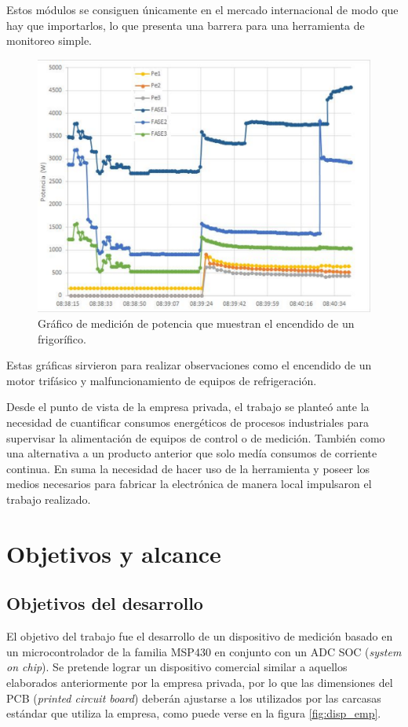 Estos módulos se consiguen únicamente en el mercado internacional de modo que hay que importarlos, lo que presenta una barrera para una herramienta de monitoreo simple.

\begin{figure}[!htb]
	\centering
	\includegraphics[width=120mm,keepaspectratio]{Figures/potencia_ej.png}
	\caption{Gráfico de medición de potencia que muestran el encendido de un frigorífico.}
	\label{fig:graficoW}
\end{figure}

Estas gráficas sirvieron para realizar observaciones como el encendido de un motor trifásico y malfuncionamiento de equipos de refrigeración.
 

Desde el punto de vista de la empresa privada, el trabajo se planteó ante la necesidad de cuantificar consumos energéticos de procesos industriales para supervisar la alimentación de equipos de control o de medición. También como una alternativa a un producto anterior que solo medía consumos de corriente continua. En suma la necesidad de hacer uso de la herramienta y poseer los medios necesarios para fabricar la electrónica de manera local  impulsaron el trabajo realizado.

\section{Objetivos y alcance}


\subsection{Objetivos del desarrollo}

El objetivo del trabajo fue el desarrollo de un dispositivo de medición basado en un microcontrolador de la familia MSP430 en conjunto con un ADC SOC (\textit{system on chip}). Se pretende lograr un dispositivo comercial similar a aquellos elaborados anteriormente por la empresa privada, por lo que las dimensiones del PCB (\textit{printed circuit board}) deberán ajustarse a los utilizados por las carcasas estándar que utiliza la empresa, como puede verse en la figura \ref{fig:disp_emp}.

